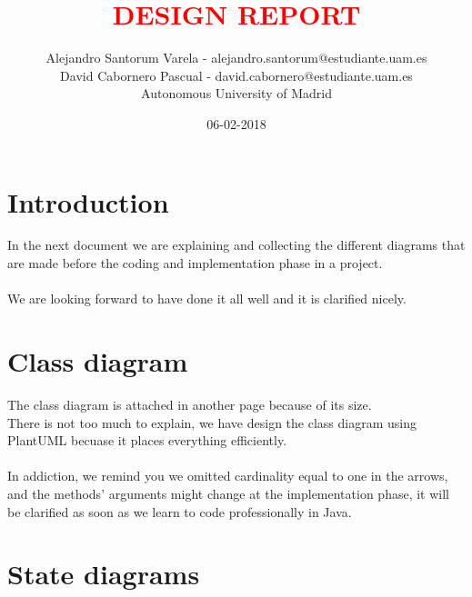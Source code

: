 \documentclass[12pt]{article}
\begin{document}
	\date{06-02-2018}
	
	
	\title{\textbf{\textcolor{red}{DESIGN REPORT}}}
	\author{Alejandro Santorum Varela - alejandro.santorum@estudiante.uam.es\\David Cabornero Pascual - david.cabornero@estudiante.uam.es\\Autonomous University of Madrid}
	\maketitle
	
\tableofcontents
\newpage


\section{Introduction}
In the next document we are explaining and collecting the different diagrams that are made before the coding and implementation phase in a project.\\\\
We are looking forward to have done it all well and it is clarified nicely.


\section{Class diagram}
The class diagram is attached in another page because of its size.\\There is not too much to explain, we have design the class diagram using PlantUML becuase it places everything efficiently.\\\\ In addiction, we remind you we omitted cardinality equal to one in the arrows, and the methods' arguments might change at the implementation phase, it will be clarified as soon as we learn to code professionally in Java.


\section{State diagrams}
\end{document}
